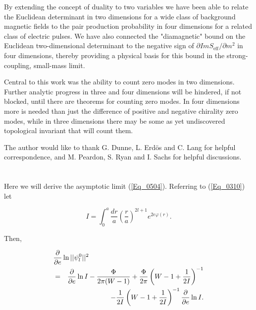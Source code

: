 \documentclass[a4paper,twocolumn,showpacs,preprintnumbers,amsmath,amssymb]{revtex4}
\newcommand{\pdo}[1]{\ensuremath{\frac{\partial }
        {\partial #1 }}}
\begin{document}
By extending the concept of duality to two variables we have been able
to relate the Euclidean determinant in two dimensions for a wide class
of background magnetic fields to the pair production probability in
four dimensions for a related class of electric pulses. We have also
connected the "diamagnetic" bound on the Euclidean two-dimensional
determinant to the negative sign of
$\partial ImS_{\text{eff}} / \partial m^2$ in four dimensions, thereby
providing a physical basis for this bound in the strong-coupling,
small-mass limit.

Central to this work was the ability to count zero modes in two
dimensions. Further analytic progress in three and four dimensions
will be hindered, if not blocked, until there are theorems for
counting zero modes. In four dimensions more is needed than just the
difference of positive and negative chirality zero modes, while in
three dimensions there may be some as yet undiscovered topological
invariant that will count them.


\begin{acknowledgments}
The author would like to thank G. Dunne, L. Erd\"{o}s and C. Lang for
helpful correspondence, and M. Peardon, S. Ryan and I. Sachs for
helpful discussions.
\end{acknowledgments}

\appendix*

\section{}

\setcounter{equation}{0}
\renewcommand{\theequation}{A\arabic{equation}}


Here we will derive the asymptotic limit (\ref{Eq_0504}). Referring to
(\ref{Eq_0310}) let

\begin{equation}
\label{Eq_A01}
I = \int^a_0 \frac{dr}{a}
  \left(\frac{r}{a}\right)^{2l+1} e^{2e \varphi(r)}.
\end{equation}

\noindent
Then,

\begin{eqnarray}
\nonumber
\lefteqn{\pdo{e} \ln ||\psi^0_l||^2}\\
\nonumber
  &=& \pdo{e} \ln I - \frac{\Phi}{2\pi (W-1)}
  + \frac{\Phi}{2\pi} \left(W - 1 + \frac{1}{2I}\right)^{-1}\\
\label{Eq_A02}
  & & - \frac{1}{2I} \left(W-1 + \frac{1}{2I}\right)^{-1} \pdo{e} \ln I.
\end{eqnarray}
\end{document}
